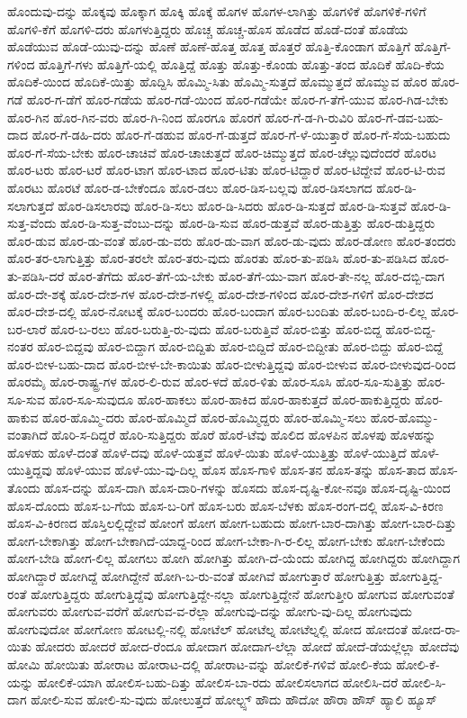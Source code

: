{ಹೊಂದುವು-ದನ್ನು
ಹೊಕ್ಕವು
ಹೊಕ್ಕಾಗ
ಹೊಕ್ಕಿ
ಹೊಕ್ಕೆ
ಹೊಗಳ
ಹೊಗಳ-ಲಾಗಿತ್ತು
ಹೊಗಳಿಕೆ
ಹೊಗಳಿಕೆ-ಗಳಿಗೆ
ಹೊಗಳಿ-ಕೆಗೆ
ಹೊಗಳಿ-ದರು
ಹೊಗಳುತ್ತಿದ್ದರು
ಹೊಚ್ಚ
ಹೊಚ್ಚ-ಹೊಸ
ಹೊಡೆದ
ಹೊಡೆ-ದಂತೆ
ಹೊಡೆಯ
ಹೊಡೆಯುವ
ಹೊಡೆ-ಯುವು-ದನ್ನು
ಹೊಣೆ
ಹೊಣೆ-ಹೊತ್ತ
ಹೊತ್ತ
ಹೊತ್ತರೆ
ಹೊತ್ತಿ-ಕೊಂಡಾಗ
ಹೊತ್ತಿಗೆ
ಹೊತ್ತಿಗೆ-ಗಳಿಂದ
ಹೊತ್ತಿಗೆ-ಗಳು
ಹೊತ್ತಿಗೆ-ಯಲ್ಲಿ
ಹೊತ್ತಿದ್ದೆ
ಹೊತ್ತು
ಹೊತ್ತು-ಕೊಂಡು
ಹೊತ್ತು-ತಂದ
ಹೊದಿಕೆ
ಹೊದಿ-ಕೆಯ
ಹೊದಿಕೆ-ಯಿಂದ
ಹೊದಿಕೆ-ಯಿತ್ತು
ಹೊದ್ದಿಸಿ
ಹೊಮ್ಮಿ-ಸಿತು
ಹೊಮ್ಮಿ-ಸುತ್ತದೆ
ಹೊಮ್ಮುತ್ತದೆ
ಹೊಮ್ಮುವ
ಹೊರ
ಹೊರ-ಗಡೆ
ಹೊರ-ಗ-ಡೆಗೆ
ಹೊರ-ಗಡೆಯ
ಹೊರ-ಗಡೆ-ಯಿಂದ
ಹೊರ-ಗಡೆಯೇ
ಹೊರ-ಗ-ತೆಗೆ-ಯುವ
ಹೊರ-ಗಿಡ-ಬೇಕು
ಹೊರ-ಗಿನ
ಹೊರ-ಗಿನ-ವರು
ಹೊರ-ಗಿ-ನಿಂದ
ಹೊರಗೂ
ಹೊರಗೆ
ಹೊರ-ಗೆ-ಡ-ಗಿ-ರುವಿರಿ
ಹೊರ-ಗೆ-ಡವ-ಬಹು-ದಾದ
ಹೊರ-ಗೆ-ಡಹಿ-ದರು
ಹೊರ-ಗೆ-ಡಹುವ
ಹೊರ-ಗೆ-ಡುತ್ತದೆ
ಹೊರ-ಗೆ-ಳೆ-ಯುತ್ತಾರೆ
ಹೊರ-ಗೆ-ಸೆಯ-ಬಹುದು
ಹೊರ-ಗೆ-ಸೆಯ-ಬೇಕು
ಹೊರ-ಚಾಚಿವೆ
ಹೊರ-ಚಾಚುತ್ತದೆ
ಹೊರ-ಚಿಮ್ಮುತ್ತದೆ
ಹೊರ-ಚೆಲ್ಲುವುದೆಂದರೆ
ಹೊರಟ
ಹೊರ-ಟರು
ಹೊರ-ಟರೆ
ಹೊರ-ಟಾಗ
ಹೊರ-ಟಾದ
ಹೊರ-ಟಿತು
ಹೊರ-ಟಿದ್ದಾರೆ
ಹೊರ-ಟಿದ್ದೇವೆ
ಹೊರ-ಟಿ-ರುವ
ಹೊರಟು
ಹೊರಟೆ
ಹೊರ-ಡ-ಬೇಕೆಂದೂ
ಹೊರ-ಡಲು
ಹೊರ-ಡಿಸ-ಬಲ್ಲವು
ಹೊರ-ಡಿಸಲಾಗದ
ಹೊರ-ಡಿ-ಸಲಾಗುತ್ತದೆ
ಹೊರ-ಡಿಸಲಾರವು
ಹೊರ-ಡಿ-ಸಲು
ಹೊರ-ಡಿ-ಸಿದರು
ಹೊರ-ಡಿ-ಸುತ್ತದೆ
ಹೊರ-ಡಿ-ಸುತ್ತವೆ
ಹೊರ-ಡಿ-ಸುತ್ತ-ವೆಂದು
ಹೊರ-ಡಿ-ಸುತ್ತ-ವೆಂಬು-ದನ್ನು
ಹೊರ-ಡಿ-ಸುವ
ಹೊರ-ಡುತ್ತವೆ
ಹೊರ-ಡುತ್ತಿತ್ತು
ಹೊರ-ಡುತ್ತಿದ್ದರು
ಹೊರ-ಡುವ
ಹೊರ-ಡು-ವಂತೆ
ಹೊರ-ಡು-ವರು
ಹೊರ-ಡು-ವಾಗ
ಹೊರ-ಡು-ವುದು
ಹೊರ-ಡೋಣ
ಹೊರ-ತಂದರು
ಹೊರ-ತರ-ಲಾಗುತ್ತಿತ್ತು
ಹೊರ-ತರಲೇ
ಹೊರ-ತರು-ವುದು
ಹೊರತು
ಹೊರ-ತು-ಪಡಿಸಿ
ಹೊರ-ತು-ಪಡಿಸಿದ
ಹೊರ-ತು-ಪಡಿಸಿ-ದರೆ
ಹೊರ-ತೆಗೆದು
ಹೊರ-ತೆಗೆ-ಯ-ಬೇಕು
ಹೊರ-ತೆಗೆ-ಯು-ವಾಗ
ಹೊರ-ತೇ-ನಲ್ಲ
ಹೊರ-ದಬ್ಬಿ-ದಾಗ
ಹೊರ-ದೇ-ಶಕ್ಕೆ
ಹೊರ-ದೇಶ-ಗಳ
ಹೊರ-ದೇಶ-ಗಳಲ್ಲಿ
ಹೊರ-ದೇಶ-ಗಳಿಂದ
ಹೊರ-ದೇಶ-ಗಳಿಗೆ
ಹೊರ-ದೇಶದ
ಹೊರ-ದೇಶ-ದಲ್ಲಿ
ಹೊರ-ನೋಟಕ್ಕೆ
ಹೊರ-ಬಂದರು
ಹೊರ-ಬಂದಾಗ
ಹೊರ-ಬಂದಿತು
ಹೊರ-ಬಂದಿ-ರ-ಲಿಲ್ಲ
ಹೊರ-ಬರ-ಲಾರೆ
ಹೊರ-ಬ-ರಲು
ಹೊರ-ಬರುತ್ತಿ-ರು-ವುದು
ಹೊರ-ಬರುತ್ತಿವೆ
ಹೊರ-ಬಿತ್ತು
ಹೊರ-ಬಿದ್ದ
ಹೊರ-ಬಿದ್ದ-ನಂತರ
ಹೊರ-ಬಿದ್ದವು
ಹೊರ-ಬಿದ್ದಾಗ
ಹೊರ-ಬಿದ್ದಿತು
ಹೊರ-ಬಿದ್ದಿದೆ
ಹೊರ-ಬಿದ್ದೀತು
ಹೊರ-ಬಿದ್ದು
ಹೊರ-ಬಿದ್ದೆ
ಹೊರ-ಬೀಳ-ಬಹು-ದಾದ
ಹೊರ-ಬೀಳ-ಬೇ-ಕಾಯಿತು
ಹೊರ-ಬೀಳುತ್ತಿದ್ದವು
ಹೊರ-ಬೀಳುವ
ಹೊರ-ಬೀಳುವುದ-ರಿಂದ
ಹೊರಮೈ
ಹೊರ-ರಾಷ್ಟ್ರ-ಗಳ
ಹೊರ-ಲಿ-ರುವ
ಹೊರ-ಳದೆ
ಹೊರ-ಳಿತು
ಹೊರ-ಸೂಸಿ
ಹೊರ-ಸೂ-ಸುತ್ತಿತ್ತು
ಹೊರ-ಸೂ-ಸುವ
ಹೊರ-ಸೂ-ಸುವುದೂ
ಹೊರ-ಹಾಕಲು
ಹೊರ-ಹಾಕಿದ
ಹೊರ-ಹಾಕುತ್ತದೆ
ಹೊರ-ಹಾಕುತ್ತಿದ್ದರು
ಹೊರ-ಹಾಕುವ
ಹೊರ-ಹೊಮ್ಮಿ-ದರು
ಹೊರ-ಹೊಮ್ಮಿದೆ
ಹೊರ-ಹೊಮ್ಮಿದ್ದರು
ಹೊರ-ಹೊಮ್ಮಿ-ಸಲು
ಹೊರ-ಹೊಮ್ಮು-ವಂತಾಗಿದೆ
ಹೊರಿ-ಸ-ದಿದ್ದರೆ
ಹೊರಿ-ಸುತ್ತಿದ್ದರು
ಹೊರೆ
ಹೊರೆ-ಟೆವು
ಹೊಲಿದ
ಹೊಳಪಿನ
ಹೊಳಪು
ಹೊಳಹನ್ನು
ಹೊಳಹು
ಹೊಳೆ-ದಂತೆ
ಹೊಳೆ-ದವು
ಹೊಳೆ-ಯತ್ತವೆ
ಹೊಳೆ-ಯಿತು
ಹೊಳೆ-ಯುತ್ತಿತ್ತು
ಹೊಳೆ-ಯುತ್ತಿದೆ
ಹೊಳೆ-ಯುತ್ತಿದ್ದವು
ಹೊಳೆ-ಯುವ
ಹೊಳೆ-ಯು-ವು-ದಿಲ್ಲ
ಹೊಸ
ಹೊಸ-ಗಾಳಿ
ಹೊಸ-ತನ
ಹೊಸ-ತನ್ನು
ಹೊಸ-ತಾದ
ಹೊಸ-ತೊಂದು
ಹೊಸ-ದನ್ನು
ಹೊಸ-ದಾಗಿ
ಹೊಸ-ದಾರಿ-ಗಳನ್ನು
ಹೊಸದು
ಹೊಸ-ದೃಷ್ಟಿ-ಕೋ-ನವೂ
ಹೊಸ-ದೃಷ್ಟಿ-ಯಿಂದ
ಹೊಸ-ದೊಂದು
ಹೊಸ-ಬ-ಗೆಯ
ಹೊಸ-ಬ-ರಿಗೆ
ಹೊಸ-ಬರು
ಹೊಸ-ಬೆಳಕು
ಹೊಸ-ರಂಗ-ದಲ್ಲಿ
ಹೊಸ-ವಿ-ಕಿರಣ
ಹೊಸ-ವಿ-ಕಿರಣದ
ಹೊಸ್ತಿಲಲ್ಲಿದ್ದೇವೆ
ಹೋಂಗೆ
ಹೋಗ
ಹೋಗ-ಬಹುದು
ಹೋಗ-ಬಾರ-ದಾಗಿತ್ತು
ಹೋಗ-ಬಾರ-ದಿತ್ತು
ಹೋಗ-ಬೇಕಾಗಿತ್ತು
ಹೋಗ-ಬೇಕಾಗಿದೆ-ಯಾದ್ದ-ರಿಂದ
ಹೋಗ-ಬೇಕಾ-ಗಿ-ರ-ಲಿಲ್ಲ
ಹೋಗ-ಬೇಕು
ಹೋಗ-ಬೇಕೆಂದು
ಹೋಗ-ಬೇಡಿ
ಹೋಗ-ಲಿಲ್ಲ
ಹೋಗಲು
ಹೋಗಿ
ಹೋಗಿತ್ತು
ಹೋಗಿ-ದೆ-ಯೆಂದು
ಹೋಗಿದ್ದ
ಹೋಗಿದ್ದರು
ಹೋಗಿದ್ದಾಗ
ಹೋಗಿದ್ದಾರೆ
ಹೋಗಿದ್ದೆ
ಹೋಗಿದ್ದೇನೆ
ಹೋಗಿ-ಬ-ರು-ವಂತೆ
ಹೋಗಿವೆ
ಹೋಗುತ್ತಾರೆ
ಹೋಗುತ್ತಿತ್ತು
ಹೋಗುತ್ತಿದ್ದ-ರಂತೆ
ಹೋಗುತ್ತಿದ್ದರು
ಹೋಗುತ್ತಿದ್ದೆವು
ಹೋಗುತ್ತಿದ್ದೇ-ನಲ್ಲಾ
ಹೋಗುತ್ತಿದ್ದೇನೆ
ಹೋಗುತ್ತೀರಿ
ಹೋಗುವ
ಹೋಗುವಂತೆ
ಹೋಗುವರು
ಹೋಗುವ-ವರೆಗೆ
ಹೋಗುವ-ವ-ರೆಲ್ಲಾ
ಹೋಗುವು-ದನ್ನು
ಹೋಗು-ವು-ದಿಲ್ಲ
ಹೋಗುವುದು
ಹೋಗುವುದೋ
ಹೋಗೋಣ
ಹೋಟಲ್ಲಿ-ನಲ್ಲಿ
ಹೋಟೆಲ್
ಹೋಟೆಲ್ನ
ಹೋಟೆಲ್ನಲ್ಲಿ
ಹೋದ
ಹೋದಂತೆ
ಹೋದ-ರಾ-ಯಿತು
ಹೋದರು
ಹೋದರೆ
ಹೋದ-ರೆಂದೂ
ಹೋದಾಗ
ಹೋದಾಗ-ಲೆಲ್ಲಾ
ಹೋದೆ
ಹೋದೆ-ಡೆಯಲ್ಲೆಲ್ಲಾ
ಹೋದೆವು
ಹೋಮಿ
ಹೋಯಿತು
ಹೋರಾಟ
ಹೋರಾಟ-ದಲ್ಲಿ
ಹೋರಾಟ-ವನ್ನು
ಹೋಲಿಕೆ-ಗಳಿವೆ
ಹೋಲಿ-ಕೆಯ
ಹೋಲಿ-ಕೆ-ಯನ್ನು
ಹೋಲಿಕೆ-ಯಾಗಿ
ಹೋಲಿಸ-ಬಹು-ದಿತ್ತು
ಹೋಲಿಸ-ಬಾ-ರದು
ಹೋಲಿಸಲಾಗದ
ಹೋಲಿಸಿ-ದರೆ
ಹೋಲಿ-ಸಿ-ದಾಗ
ಹೋಲಿ-ಸುವ
ಹೋಲಿ-ಸು-ವುದು
ಹೋಲುತ್ತದೆ
ಹೋಲ್ಟ್ಸ್
ಹೌದು
ಹೌದೋ
ಹೌರಾ
ಹೌಸ್
ಹ್ಯಾಲಿ
ಹ್ಯೂಸ್
}
